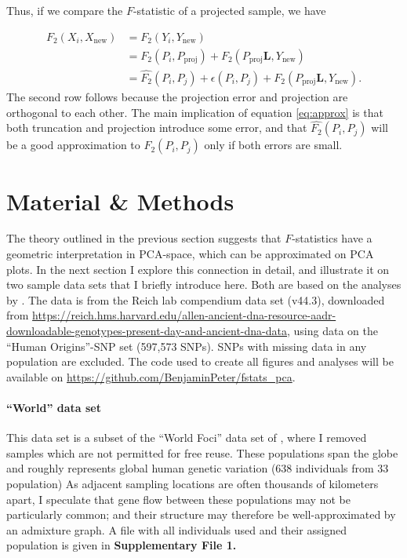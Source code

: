 \documentclass[12pt,fullpage, a4paper]{article}
\newcommand{\normsq}[1]{\left\lVert#1\right\rVert^2}
\newcommand{\ML}{\mathbf{L}} %
\newcommand{\MSINGULAR}{\mathbf{\Sigma}} %
\begin{document}

Thus, if we compare the $F$-statistic of a projected sample, we have 

\begin{align}
F_2(X_i, X_{\text{new}}) &= F_2(Y_i, Y_{\text{new}})\nonumber\\ 
&= F_2(P_i, P_{\text{proj}}) + F_2(P_{\text{proj}}\ML, Y_{\text{new}})\nonumber\\
&= \hat{F_2}(P_i, P_j) + {\epsilon(P_i, P_j)} + F_2(P_{\text{proj}}\ML, Y_{\text{new}}) \label{eq:approx}.
\end{align}
The second row follows because the projection error and projection are orthogonal to each other. The main implication of equation \ref{eq:approx} is that both truncation and projection introduce some error, and that $ \hat{F_2}(P_i, P_j)$ will be a good approximation to  $F_2(P_i, P_j)$ only if both errors are small.


\section{Material \& Methods}
The theory outlined in the previous section suggests that $F$-statistics have a geometric interpretation in PCA-space, which can be approximated on PCA plots. In the next section I explore this connection in detail, and illustrate it on two sample data sets that I briefly introduce here. Both are based on the analyses by \cite{lazaridis2014}. The data is from the Reich lab compendium data set (v44.3), downloaded from \url{https://reich.hms.harvard.edu/allen-ancient-dna-resource-aadr-downloadable-genotypes-present-day-and-ancient-dna-data}, using data on the ``Human Origins''-SNP set (597,573 SNPs). SNPs with missing data in any population are excluded. The code used to create all figures and analyses will be available on \url{https://github.com/BenjaminPeter/fstats_pca}.

\paragraph{``World'' data set}
This data set is a subset of the ``World Foci'' data set of \cite{lazaridis2014}, where I removed samples which are not permitted for free reuse. These populations span the globe and roughly represents global human genetic variation (638 individuals from 33 population) As adjacent sampling locations are often thousands of kilometers apart, I speculate that gene flow between these populations may not be particularly common; and their structure may therefore be well-approximated by an admixture graph. A file with all individuals used and their assigned population is given in \textbf{Supplementary File 1.}
\end{document}
